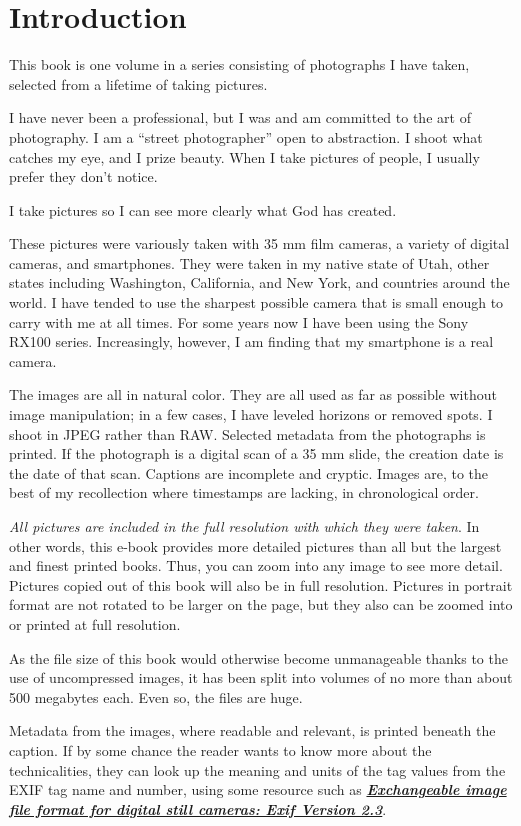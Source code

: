 \chapter{Introduction}

This book is one volume in a series consisting of photographs I have taken, selected from a lifetime of taking pictures. 

I have never been a professional, but I was and am committed to the art of photography. I am a ``street photographer'' open to abstraction. I shoot what catches my eye, and I prize beauty. When I take pictures of people, I usually prefer they don't notice. 

I take pictures so I can see more clearly what God has created.

These pictures were variously taken with 35 mm film cameras, a variety of digital cameras, and smartphones. They were taken in my native state of Utah, other states including Washington, California, and New York, and countries around the world. I have tended to use the sharpest possible camera that is small enough to carry with me at all times. For some years now I have been using the Sony RX100 series. Increasingly, however, I am finding that my smartphone is a real camera.

The images are all in natural color. They are all used as far as possible without image manipulation; in a few cases, I have leveled horizons or removed spots. I shoot in JPEG rather than RAW. Selected metadata from the photographs is printed. If the photograph is a digital scan of a 35 mm slide, the creation date is the date of that scan. Captions are incomplete and cryptic. Images are, to the best of my recollection where timestamps are lacking, in chronological order.

\emph{All pictures are included in the full resolution with which they were taken}. In other words, this e-book provides more detailed pictures than all but the  largest and finest printed books. Thus, you can zoom into any image to see more detail. Pictures copied out of this book will also be in full resolution. Pictures in portrait format are not rotated to be larger on the page, but they also can be zoomed into or printed at full resolution. 

 As the file size of this book would otherwise become unmanageable thanks to the use of uncompressed images, it has been split into volumes of no more than about 500 megabytes each. Even so, the files are huge. 

Metadata from the images, where readable and relevant, is printed beneath the caption. If by some chance the reader wants to know more about the technicalities, they can look up the meaning and units of the tag values from the EXIF tag name and number, using some resource such as \href{https://www.cipa.jp/std/documents/e/DC-008-2012_E.pdf}{\emph{\textbf{Exchangeable image file format for digital still cameras: Exif Version 2.3}}}.

